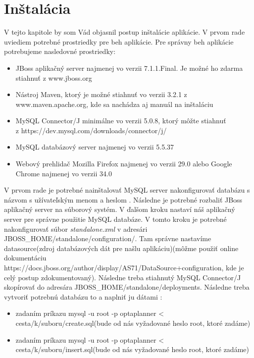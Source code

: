 \chapter{Inštalácia}
{
	V tejto kapitole by som Vád objasnil postup inštalácie aplikácie. V prvom rade uviediem potrebné prostriedky pre beh aplikácie. Pre správny beh aplikácie potrebujeme nasledovné prostriedky:
	\begin{itemize}
	\item JBoss aplikačný server najmenej vo verzii 7.1.1.Final. Je možné ho zdarma stiahnuť z www.jboss.org
	\item Nástroj Maven, ktorý je možné stiahnuť vo verzii 3.2.1 z www.maven.apache.org, kde sa nachádza aj manuál na inštaláciu
	\item MySQL Connector/J minimálne vo verzii 5.0.8, ktorý môžte stiahnuť  \\ z https://dev.mysql.com/downloads/connector/j/
	\item MySQL databázový server najmenej vo verzii 5.5.37
	\item Webový prehlidač Mozilla Firefox najmenej vo verzii 29.0 alebo Google Chrome najmenej vo verzii 34.0
	\end{itemize}
	V prvom rade je potrebné nainštalovať MySQL server nakonfigurovať databázu s názvom  s užívateľským menom  a heslom . Následne je potrebné rozbaliť JBoss aplikačný server na súborový systém. V ďalšom kroku nastaví náš aplikačný server pre správne použitie MySQL databáze. V tomto kroku je potrebné nakonfigurovať súbor \emph{standalone.xml} v adresári JBOSS\_HOME/standalone/configuration/. Tam správne nastavíme datasource(zdroj databázových dát pre našlu aplikáciu)(môžme použiť online dokumentáciu https://docs.jboss.org/author/display/AS71/DataSource+configuration, kde je celý postup zdokumentovaný). Následne treba stiahnutý MySQL Connector/J skopírovať do adresára JBOSS\_HOME/standalone/deployments. Následne treba vytvoriť potrebnú databázu to a naplniť ju dátami :
	\begin{itemize}
	\item zadaním príkazu mysql -u root -p optaplanner < cesta/k/suboru/create.sql(bude od nás vyžadované heslo root, ktoré zadáme)
	\item zadaním príkazu mysql -u root -p optaplanner < cesta/k/suboru/insert.sql(bude od nás vyžadované heslo root, ktoré zadáme)
	\end{itemize}

}
